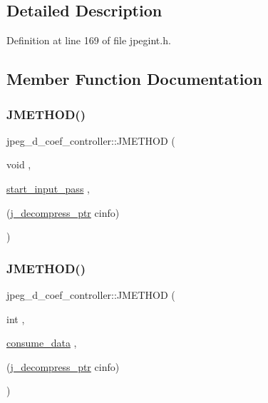 \subsection{Detailed Description}


Definition at line 169 of file jpegint.\+h.



\subsection{Member Function Documentation}
\mbox{\label{structjpeg__d__coef__controller_ab4b18cfac761c7186363a845e36f342c}} 
\subsubsection{\texorpdfstring{JMETHOD()}{JMETHOD()}\hspace{0.1cm}{\footnotesize\ttfamily [1/4]}}
{\footnotesize\ttfamily jpeg\+\_\+d\+\_\+coef\+\_\+controller\+::\+J\+M\+E\+T\+H\+OD (\begin{DoxyParamCaption}\item[{void}]{,  }\item[{\mbox{\hyperlink{jdinput_8c_abc0a94e24edf93bc7f914cf4a698a870}{start\+\_\+input\+\_\+pass}}}]{,  }\item[{(\mbox{\hyperlink{jpeglib_8h_a00c7d78af44bd26a901c791ccfc1e178}{j\+\_\+decompress\+\_\+ptr}} cinfo)}]{ }\end{DoxyParamCaption})}

\mbox{\label{structjpeg__d__coef__controller_a4c0e8d307e0852eae338a0f4f3c96edb}} 
\subsubsection{\texorpdfstring{JMETHOD()}{JMETHOD()}\hspace{0.1cm}{\footnotesize\ttfamily [2/4]}}
{\footnotesize\ttfamily jpeg\+\_\+d\+\_\+coef\+\_\+controller\+::\+J\+M\+E\+T\+H\+OD (\begin{DoxyParamCaption}\item[{int}]{,  }\item[{\mbox{\hyperlink{jdcoefct_8c_a474c99ffcdc94688233e34f65e95c50d}{consume\+\_\+data}}}]{,  }\item[{(\mbox{\hyperlink{jpeglib_8h_a00c7d78af44bd26a901c791ccfc1e178}{j\+\_\+decompress\+\_\+ptr}} cinfo)}]{ }\end{DoxyParamCaption})}

